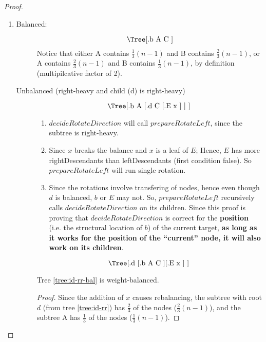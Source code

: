 \documentclass[12pt]{article}
\begin{document}
\begin{proof}
\begin{enumerate}
\item
\begin{description}
\item[Balanced:]
\begin{equation}\label{tree:gen-bal}
\text{\Tree[.b A C ]}\\ 
\end{equation}
Notice that either A contains $\frac{1}{3}(n-1)$ and B contains $\frac{2}{3}(n-1)$, or A contains $\frac{2}{3}(n-1)$ and B contains $\frac{1}{3}(n-1)$, by definition (multipilcative factor of 2).\\

\item[Unbalanced (right-heavy and child (d) is right-heavy)]
\begin{equation}\label{tree:id-rr}
\text{\Tree[.b A [.d C [.E x ] ] ] }\\
\end{equation}

\begin{enumerate}
\item $decideRotateDirection$ will call $prepareRotateLeft$, since the subtree is right-heavy.
\item Since $x$ breaks the balance and $x$ is a leaf of $E$; Hence, $E$ has more rightDescendants than leftDescendants (first condition false). So $prepareRotateLeft$ will run single rotation.
\item Since the rotations involve transfering of nodes, hence even though $d$ is balanced, $b$ or $E$ may not.
So, $prepareRotateLeft$ recursively calls $decideRotateDirection$ on its children.
Since this proof is proving that $decideRotateDirection$ is correct for the {\bf position} (i.e. the structural location of $b$) of the current target, {\bf as long as it works for the position of the ``current'' node, it will also work on its children}.
\end{enumerate}
\begin{equation}\label{tree:id-rr-bal}
\text{\Tree[.d [.b A C ] [.E x ] ] }\\
\end{equation}

\begin{claim}
Tree \ref{tree:id-rr-bal} is weight-balanced.
\end{claim}
\begin{proof}
Since the addition of $x$ causes rebalancing, the subtree with root $d$ (from tree \ref{tree:id-rr}) has $\frac{2}{3}$ of the nodes ($\frac{2}{3}(n-1)$), and the subtree A has $\frac{1}{3}$ of the nodes ($\frac{1}{3}(n-1)$).


\end{proof}
\end{description}
\end{enumerate}
\end{proof}
\end{document}
